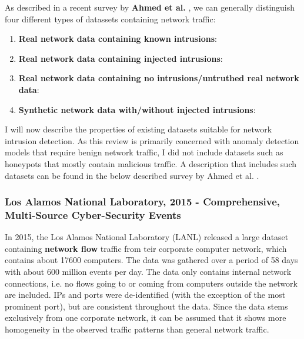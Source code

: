 \documentclass[a4paper,12pt,twoside]{report}
\begin{document}
As described in a recent survey by \textbf{Ahmed et al.} \cite{ahmed2016survey}, we can generally distinguish four different types of datassets containing network traffic:

\begin{enumerate}

\item \textbf{Real network data containing known intrusions}: 

\item \textbf{Real network data containing injected intrusions}:

\item \textbf{Real network data containing no intrusions/untruthed real network data}:

\item \textbf{Synthetic network data with/without injected intrusions}:

\end{enumerate}

I will now describe the properties of existing datasets suitable for network intrusion detection. As this review is primarily concerned with anomaly detection models that require benign network traffic, I did not include datasets such as honeypots that mostly contain malicious traffic. A description that includes such datasets can be found in the below described survey by Ahmed et al. \cite{ahmed2016survey}.



\subsubsection*{Los Alamos National Laboratory, 2015 - Comprehensive, Multi-Source Cyber-Security Events \cite{akent-2015-enterprise-data}\cite{kent-2015-cyberdata1}}

In 2015, the Los Alamos National Laboratory (LANL) released a large dataset containing \textbf{network flow} traffic from teir corporate computer network, which contains about 17600 computers. The data was gathered over a period of 58 days with about 600 million events per day. The data only contains internal network connections, i.e. no flows going to or coming from computers outside the network are included. IPs and ports were de-identified (with the exception of the most prominent port), but are consistent throughout the data. Since the data stems exclusively from one corporate network, it can be assumed that it shows more homogeneity in the observed traffic patterns than  general network traffic.
\end{document}
